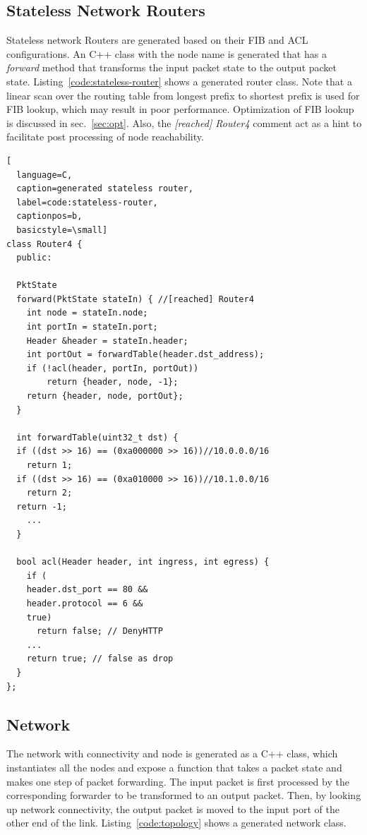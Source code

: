 \documentclass[letterpaper, 10 pt, conference]{ieeeconf}  %
\begin{document}
\subsection{Stateless Network Routers}
Stateless network Routers are generated based on their FIB and ACL configurations. An C++ class with the node name is generated that has a \emph{forward} method that transforms the input packet state to the output packet state. Listing~\ref{code:stateless-router} shows a generated router class. Note that a linear scan over the routing table from longest prefix to shortest prefix is used for FIB lookup, which may result in poor performance. Optimization of FIB lookup is discussed in sec.~\ref{sec:opt}. Also, the \emph{[reached] Router4} comment act as a hint to facilitate post processing of node reachability.

\begin{lstlisting}[
  language=C,
  caption=generated stateless router,
  label=code:stateless-router,
  captionpos=b,
  basicstyle=\small]
class Router4 {
  public:
  
  PktState 
  forward(PktState stateIn) { //[reached] Router4
    int node = stateIn.node;
    int portIn = stateIn.port;
    Header &header = stateIn.header;
    int portOut = forwardTable(header.dst_address);
    if (!acl(header, portIn, portOut)) 
        return {header, node, -1};
    return {header, node, portOut};
  }
  
  int forwardTable(uint32_t dst) {
  if ((dst >> 16) == (0xa000000 >> 16))//10.0.0.0/16
    return 1;
  if ((dst >> 16) == (0xa010000 >> 16))//10.1.0.0/16
    return 2;
  return -1;
    ...
  }
  
  bool acl(Header header, int ingress, int egress) {
    if (
    header.dst_port == 80 &&
    header.protocol == 6 &&
    true)
      return false; // DenyHTTP
    ...
    return true; // false as drop
  }
};
\end{lstlisting}


\subsection{Network}

The network with connectivity and node is generated as a C++ class, which instantiates all the nodes and expose a function that takes a packet state and makes one step of packet forwarding. The input packet is first processed by the corresponding forwarder to be transformed to an output packet. Then, by looking up network connectivity, the output packet is moved to the input port of the other end of the link.  Listing~\ref{code:topology} shows a generated network class.
\end{document}
